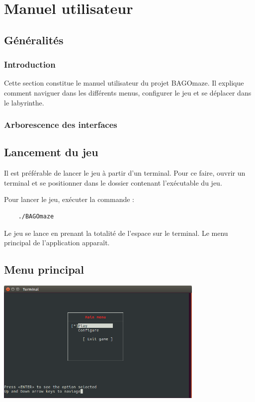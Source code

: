 \chapter{Manuel utilisateur}

\section{Généralités}
\subsection{Introduction}

Cette section constitue le manuel utilisateur du projet BAGOmaze. Il explique comment naviguer dans les différents menus, configurer le jeu et se déplacer dans le labyrinthe.

\subsection{Arborescence des interfaces}



\section{Lancement du jeu}

Il est préférable de lancer le jeu à partir d'un terminal. Pour ce faire, ouvrir un terminal et se positionner dans le dossier contenant l'exécutable du jeu.

Pour lancer le jeu, exécuter la commande :
\begin{Verbatim}
	./BAGOmaze
\end{Verbatim}

Le jeu se lance en prenant la totalité de l'espace sur le terminal. Le menu principal de l'application apparaît.


\section{Menu principal}

\begin{center}
	\includegraphics[width=0.75\textwidth]{annexe-manuel_utilisateur/rsrc/Main_Menu.png}
\end{center}

